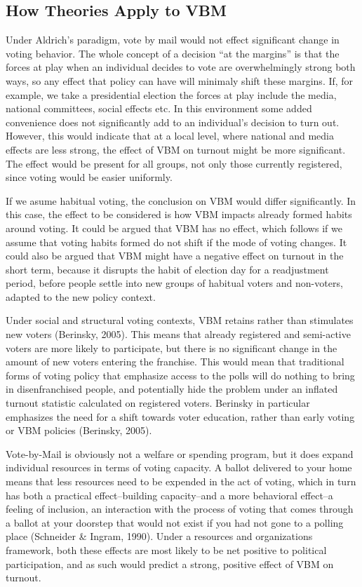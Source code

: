 \documentclass[12pt,twoside]{reedthesis}
\begin{document}
  \subsection{How Theories Apply to VBM}\label{how-theories-apply-to-vbm}
  
  Under Aldrich's paradigm, vote by mail would not effect significant
  change in voting behavior. The whole concept of a decision ``at the
  margins'' is that the forces at play when an individual decides to vote
  are overwhelmingly strong both ways, so any effect that policy can have
  will minimaly shift these margins. If, for example, we take a
  presidential election the forces at play include the media, national
  committees, social effects etc. In this environment some added
  convenience does not significantly add to an individual's decision to
  turn out. However, this would indicate that at a local level, where
  national and media effects are less strong, the effect of VBM on turnout
  might be more significant. The effect would be present for all groups,
  not only those currently registered, since voting would be easier
  uniformly.
  
  If we asume habitual voting, the conclusion on VBM would differ
  significantly. In this case, the effect to be considered is how VBM
  impacts already formed habits around voting. It could be argued that VBM
  has no effect, which follows if we assume that voting habits formed do
  not shift if the mode of voting changes. It could also be argued that
  VBM might have a negative effect on turnout in the short term, because
  it disrupts the habit of election day for a readjustment period, before
  people settle into new groups of habitual voters and non-voters, adapted
  to the new policy context.
  
  Under social and structural voting contexts, VBM retains rather than
  stimulates new voters (Berinsky, 2005). This means that already
  registered and semi-active voters are more likely to participate, but
  there is no significant change in the amount of new voters entering the
  franchise. This would mean that traditional forms of voting policy that
  emphasize access to the polls will do nothing to bring in
  disenfranchised people, and potentially hide the problem under an
  inflated turnout statistic calculated on registered voters. Berinsky in
  particular emphasizes the need for a shift towards voter education,
  rather than early voting or VBM policies (Berinsky, 2005).
  
  Vote-by-Mail is obviously not a welfare or spending program, but it does
  expand individual resources in terms of voting capacity. A ballot
  delivered to your home means that less resources need to be expended in
  the act of voting, which in turn has both a practical effect--building
  capacity--and a more behavioral effect--a feeling of inclusion, an
  interaction with the process of voting that comes through a ballot at
  your doorstep that would not exist if you had not gone to a polling
  place (Schneider \& Ingram, 1990). Under a resources and organizations
  framework, both these effects are most likely to be net positive to
  political participation, and as such would predict a strong, positive
  effect of VBM on turnout.
  
\end{document}
